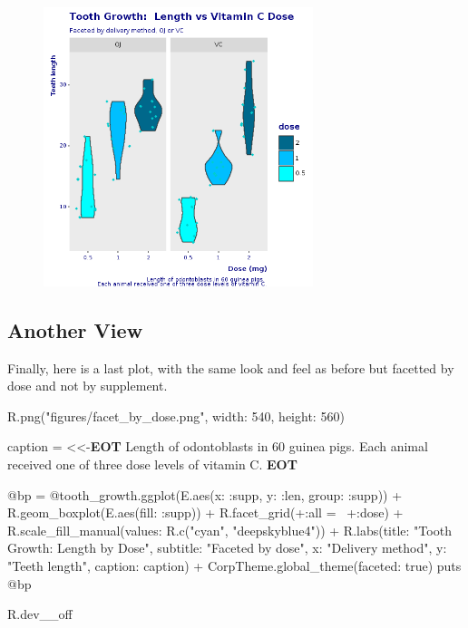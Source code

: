 \documentclass[11pt,]{article}
\newenvironment{Shaded}{\begin{snugshade}}{\end{snugshade}}
\newcommand{\KeywordTok}[1]{\textcolor[rgb]{0.13,0.29,0.53}{\textbf{#1}}}
\newcommand{\DataTypeTok}[1]{\textcolor[rgb]{0.13,0.29,0.53}{#1}}
\newcommand{\DecValTok}[1]{\textcolor[rgb]{0.00,0.00,0.81}{#1}}
\newcommand{\StringTok}[1]{\textcolor[rgb]{0.31,0.60,0.02}{#1}}
\newcommand{\OtherTok}[1]{\textcolor[rgb]{0.56,0.35,0.01}{#1}}
\newcommand{\NormalTok}[1]{#1}
\begin{document}
\begin{figure}
\centering
\includegraphics[width=0.70000\textwidth]{figures/final_violin_plot.png}
\caption{}
\end{figure}

\subsection{Another View}\label{another-view}

Finally, here is a last plot, with the same look and feel as before but
facetted by dose and not by supplement.

\begin{Shaded}
\begin{Highlighting}[]
\NormalTok{R.png(}\StringTok{"figures/facet_by_dose.png"}\NormalTok{, }\StringTok{width: }\DecValTok{540}\NormalTok{, }\StringTok{height: }\DecValTok{560}\NormalTok{)}

\NormalTok{caption = <<-}\KeywordTok{EOT}
\OtherTok{Length of odontoblasts in 60 guinea pigs. }
\OtherTok{Each animal received one of three dose levels of vitamin C.}
\KeywordTok{EOT}

\OtherTok{@bp}\NormalTok{ = }\OtherTok{@tooth_growth}\NormalTok{.ggplot(E.aes(}\StringTok{x: :supp}\NormalTok{, }\StringTok{y: :len}\NormalTok{, }\StringTok{group: :supp}\NormalTok{)) + }
\NormalTok{      R.geom_boxplot(E.aes(}\StringTok{fill: :supp}\NormalTok{)) + R.facet_grid(+}\StringTok{:all}\NormalTok{ =~ +}\StringTok{:dose}\NormalTok{) +}
\NormalTok{      R.scale_fill_manual(}\StringTok{values: }\NormalTok{R.c(}\StringTok{"cyan"}\NormalTok{, }\StringTok{"deepskyblue4"}\NormalTok{)) +}
\NormalTok{      R.labs(}\StringTok{title: "Tooth Growth:  Length by Dose"}\NormalTok{,}
             \StringTok{subtitle: "Faceted by dose"}\NormalTok{,}
             \StringTok{x: "Delivery method"}\NormalTok{, }\StringTok{y: "Teeth length"}\NormalTok{,}
             \StringTok{caption: }\NormalTok{caption) +}
      \DataTypeTok{CorpTheme}\NormalTok{.global_theme(}\StringTok{faceted: }\DecValTok{true}\NormalTok{)}
\NormalTok{puts }\OtherTok{@bp}

\NormalTok{R.dev__off}
\end{Highlighting}
\end{Shaded}
\end{document}
